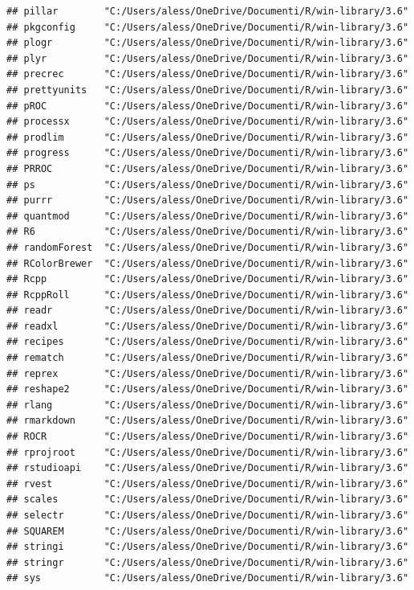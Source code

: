 \documentclass[]{article}
\begin{document}
\begin{verbatim}
## pillar        "C:/Users/aless/OneDrive/Documenti/R/win-library/3.6"
## pkgconfig     "C:/Users/aless/OneDrive/Documenti/R/win-library/3.6"
## plogr         "C:/Users/aless/OneDrive/Documenti/R/win-library/3.6"
## plyr          "C:/Users/aless/OneDrive/Documenti/R/win-library/3.6"
## precrec       "C:/Users/aless/OneDrive/Documenti/R/win-library/3.6"
## prettyunits   "C:/Users/aless/OneDrive/Documenti/R/win-library/3.6"
## pROC          "C:/Users/aless/OneDrive/Documenti/R/win-library/3.6"
## processx      "C:/Users/aless/OneDrive/Documenti/R/win-library/3.6"
## prodlim       "C:/Users/aless/OneDrive/Documenti/R/win-library/3.6"
## progress      "C:/Users/aless/OneDrive/Documenti/R/win-library/3.6"
## PRROC         "C:/Users/aless/OneDrive/Documenti/R/win-library/3.6"
## ps            "C:/Users/aless/OneDrive/Documenti/R/win-library/3.6"
## purrr         "C:/Users/aless/OneDrive/Documenti/R/win-library/3.6"
## quantmod      "C:/Users/aless/OneDrive/Documenti/R/win-library/3.6"
## R6            "C:/Users/aless/OneDrive/Documenti/R/win-library/3.6"
## randomForest  "C:/Users/aless/OneDrive/Documenti/R/win-library/3.6"
## RColorBrewer  "C:/Users/aless/OneDrive/Documenti/R/win-library/3.6"
## Rcpp          "C:/Users/aless/OneDrive/Documenti/R/win-library/3.6"
## RcppRoll      "C:/Users/aless/OneDrive/Documenti/R/win-library/3.6"
## readr         "C:/Users/aless/OneDrive/Documenti/R/win-library/3.6"
## readxl        "C:/Users/aless/OneDrive/Documenti/R/win-library/3.6"
## recipes       "C:/Users/aless/OneDrive/Documenti/R/win-library/3.6"
## rematch       "C:/Users/aless/OneDrive/Documenti/R/win-library/3.6"
## reprex        "C:/Users/aless/OneDrive/Documenti/R/win-library/3.6"
## reshape2      "C:/Users/aless/OneDrive/Documenti/R/win-library/3.6"
## rlang         "C:/Users/aless/OneDrive/Documenti/R/win-library/3.6"
## rmarkdown     "C:/Users/aless/OneDrive/Documenti/R/win-library/3.6"
## ROCR          "C:/Users/aless/OneDrive/Documenti/R/win-library/3.6"
## rprojroot     "C:/Users/aless/OneDrive/Documenti/R/win-library/3.6"
## rstudioapi    "C:/Users/aless/OneDrive/Documenti/R/win-library/3.6"
## rvest         "C:/Users/aless/OneDrive/Documenti/R/win-library/3.6"
## scales        "C:/Users/aless/OneDrive/Documenti/R/win-library/3.6"
## selectr       "C:/Users/aless/OneDrive/Documenti/R/win-library/3.6"
## SQUAREM       "C:/Users/aless/OneDrive/Documenti/R/win-library/3.6"
## stringi       "C:/Users/aless/OneDrive/Documenti/R/win-library/3.6"
## stringr       "C:/Users/aless/OneDrive/Documenti/R/win-library/3.6"
## sys           "C:/Users/aless/OneDrive/Documenti/R/win-library/3.6"

\end{verbatim}
\end{document}
